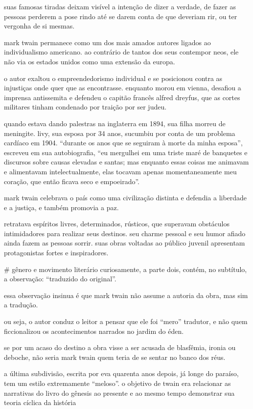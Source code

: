 suas famosas tiradas deixam visível a intenção de dizer a verdade, de fazer as pessoas perderem a pose rindo até se darem conta de que deveriam rir, ou ter vergonha de si mesmas.

mark twain permanece como um dos mais amados autores ligados ao individualismo americano. ao contrário de tantos dos seus contempor neos, ele não via os estados unidos como uma extensão da europa. 

o autor exaltou o empreendedorismo individual e se posicionou contra as injustiças onde quer que as encontrasse. enquanto morou em vienna, desafiou a imprensa antissemita e defendeu o capitão francês alfred dreyfus, que as cortes militares tinham condenado por traição por ser judeu.

quando estava dando palestras na inglaterra em 1894, sua filha morreu de meningite. livy, sua esposa por 34 anos, sucumbiu por conta de um problema cardíaco em 1904. “durante os anos que se seguiram à morte da minha esposa”, escreveu em sua autobiografia, “eu mergulhei em uma triste maré de banquetes e discursos sobre causas elevadas e santas; mas enquanto essas coisas me animavam e alimentavam intelectualmente, elas tocavam apenas momentaneamente meu coração, que então ficava seco e empoeirado”.

mark twain celebrava o país como uma civilização distinta e defendia a liberdade e a justiça, e também promovia a paz. 

retratava espíritos livres, determinados, rústicos, que superavam obstáculos intimidadores para realizar seus destinos. seu charme pessoal e seu humor afiado ainda fazem as pessoas sorrir. suas obras voltadas ao público juvenil apresentam protagonistas fortes e inspiradores.


# gênero e movimento literário
curiosamente, a parte dois, contém, no subtítulo, a observação: “traduzido do original”.

essa observação insinua é que mark twain não assume a autoria da obra, mas sim a tradução.

ou seja, o autor conduz o leitor a pensar que ele foi “mero” tradutor, e não quem ficcionalizou os acontecimentos narrados no jardim do éden.

se por um acaso do destino a obra visse a ser acusada de blasfêmia, ironia ou deboche, não seria mark twain quem teria de se sentar no banco dos réus.

a última subdivisão, escrita por eva quarenta anos depois, já longe do paraíso, tem um estilo extremamente “meloso”.
o objetivo de twain era relacionar as narrativas do livro do gênesis ao presente e ao mesmo tempo demonstrar sua teoria cíclica da história

